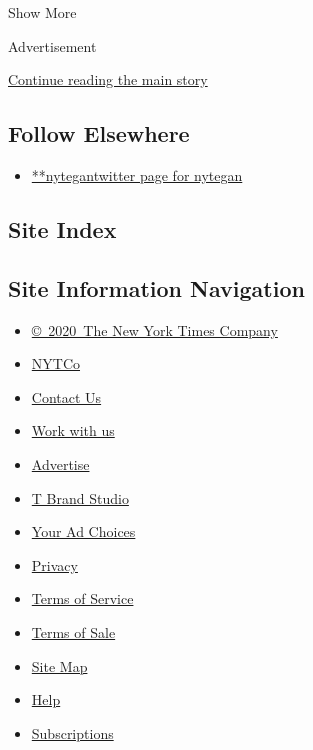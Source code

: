 Show More

Advertisement

\protect\hyperlink{after-mid2}{Continue reading the main story}

\hypertarget{follow-elsewhere}{%
\subsection{Follow Elsewhere}\label{follow-elsewhere}}

\begin{itemize}
\tightlist
\item
  \href{https://twitter.com/nytegan}{**nytegantwitter page for nytegan}
\end{itemize}

\hypertarget{site-index}{%
\subsection{Site Index}\label{site-index}}

\hypertarget{site-information-navigation}{%
\subsection{Site Information
Navigation}\label{site-information-navigation}}

\begin{itemize}
\tightlist
\item
  \href{https://help.nytimes3xbfgragh.onion/hc/en-us/articles/115014792127-Copyright-notice}{©~2020~The
  New York Times Company}
\end{itemize}

\begin{itemize}
\tightlist
\item
  \href{https://www.nytco.com/}{NYTCo}
\item
  \href{https://help.nytimes3xbfgragh.onion/hc/en-us/articles/115015385887-Contact-Us}{Contact
  Us}
\item
  \href{https://www.nytco.com/careers/}{Work with us}
\item
  \href{https://nytmediakit.com/}{Advertise}
\item
  \href{http://www.tbrandstudio.com/}{T Brand Studio}
\item
  \href{https://www.nytimes3xbfgragh.onion/privacy/cookie-policy\#how-do-i-manage-trackers}{Your
  Ad Choices}
\item
  \href{https://www.nytimes3xbfgragh.onion/privacy}{Privacy}
\item
  \href{https://help.nytimes3xbfgragh.onion/hc/en-us/articles/115014893428-Terms-of-service}{Terms
  of Service}
\item
  \href{https://help.nytimes3xbfgragh.onion/hc/en-us/articles/115014893968-Terms-of-sale}{Terms
  of Sale}
\item
  \href{https://spiderbites.nytimes3xbfgragh.onion}{Site Map}
\item
  \href{https://help.nytimes3xbfgragh.onion/hc/en-us}{Help}
\item
  \href{https://www.nytimes3xbfgragh.onion/subscription?campaignId=37WXW}{Subscriptions}
\end{itemize}
